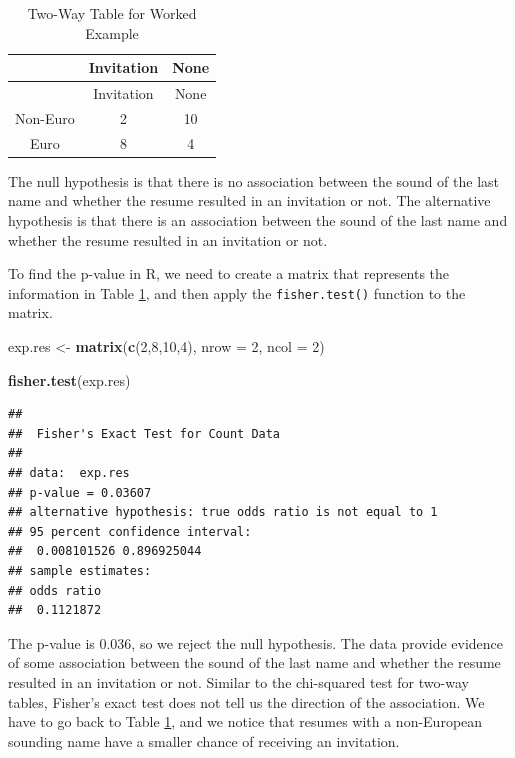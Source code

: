 \documentclass[
]{book}
\newenvironment{Shaded}{\begin{snugshade}}{\end{snugshade}}
\newcommand{\AttributeTok}[1]{\textcolor[rgb]{0.13,0.29,0.53}{#1}}
\newcommand{\DecValTok}[1]{\textcolor[rgb]{0.00,0.00,0.81}{#1}}
\newcommand{\FunctionTok}[1]{\textcolor[rgb]{0.13,0.29,0.53}{\textbf{#1}}}
\newcommand{\NormalTok}[1]{#1}
\newcommand{\OtherTok}[1]{\textcolor[rgb]{0.56,0.35,0.01}{#1}}
\theoremstyle{definition}
\theoremstyle{definition}
\theoremstyle{definition}
\theoremstyle{definition}
\theoremstyle{remark}
\begin{document}
\begin{longtable}[]{@{}ccc@{}}
\caption{\label{tab:egexact} Two-Way Table for Worked Example}\tabularnewline
\toprule\noalign{}
& Invitation & None \\
\midrule\noalign{}
\endfirsthead
\toprule\noalign{}
& Invitation & None \\
\midrule\noalign{}
\endhead
\bottomrule\noalign{}
\endlastfoot
Non-Euro & 2 & 10 \\
Euro & 8 & 4 \\
\end{longtable}

The null hypothesis is that there is no association between the sound of the last name and whether the resume resulted in an invitation or not. The alternative hypothesis is that there is an association between the sound of the last name and whether the resume resulted in an invitation or not.

To find the p-value in R, we need to create a matrix that represents the information in Table \ref{tab:egexact}, and then apply the \texttt{fisher.test()} function to the matrix.

\begin{Shaded}
\begin{Highlighting}[]
\NormalTok{exp.res }\OtherTok{\textless{}{-}} \FunctionTok{matrix}\NormalTok{(}\FunctionTok{c}\NormalTok{(}\DecValTok{2}\NormalTok{,}\DecValTok{8}\NormalTok{,}\DecValTok{10}\NormalTok{,}\DecValTok{4}\NormalTok{), }\AttributeTok{nrow =} \DecValTok{2}\NormalTok{, }\AttributeTok{ncol =} \DecValTok{2}\NormalTok{)}

\FunctionTok{fisher.test}\NormalTok{(exp.res)}
\end{Highlighting}
\end{Shaded}

\begin{verbatim}
## 
##  Fisher's Exact Test for Count Data
## 
## data:  exp.res
## p-value = 0.03607
## alternative hypothesis: true odds ratio is not equal to 1
## 95 percent confidence interval:
##  0.008101526 0.896925044
## sample estimates:
## odds ratio 
##  0.1121872
\end{verbatim}

The p-value is 0.036, so we reject the null hypothesis. The data provide evidence of some association between the sound of the last name and whether the resume resulted in an invitation or not. Similar to the chi-squared test for two-way tables, Fisher's exact test does not tell us the direction of the association. We have to go back to Table \ref{tab:egexact}, and we notice that resumes with a non-European sounding name have a smaller chance of receiving an invitation.
\end{document}

